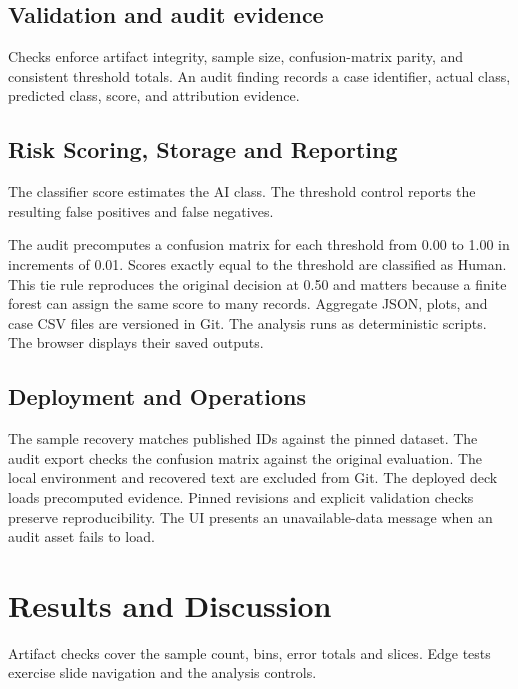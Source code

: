 \documentclass[12pt,oneside]{report}
\begin{document}
\section{Validation and audit evidence}
Checks enforce artifact integrity, sample size, confusion-matrix parity, and consistent threshold totals.
An audit finding records a case identifier, actual class, predicted class, score, and attribution evidence.
\section{Risk Scoring, Storage and Reporting}
The classifier score estimates the AI class. The threshold control reports the resulting false positives and false negatives.

The audit precomputes a confusion matrix for each threshold from 0.00 to 1.00 in increments of 0.01. Scores exactly equal to the threshold are classified as Human. This tie rule reproduces the original decision at 0.50 and matters because a finite forest can assign the same score to many records.
Aggregate JSON, plots, and case CSV files are versioned in Git.
The analysis runs as deterministic scripts. The browser displays their saved outputs.
\section{Deployment and Operations}
The sample recovery matches published IDs against the pinned dataset. The audit export checks the confusion matrix against the original evaluation. The local environment and recovered text are excluded from Git. The deployed deck loads precomputed evidence.
Pinned revisions and explicit validation checks preserve reproducibility. The UI presents an unavailable-data message when an audit asset fails to load.
\chapter{Results and Discussion}
Artifact checks cover the sample count, bins, error totals and slices. Edge tests exercise slide navigation and the analysis controls.
\end{document}
